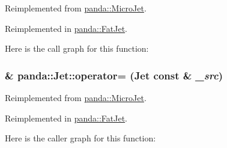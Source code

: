 Reimplemented from \hyperlink{classpanda_1_1MicroJet_ae7b83b860f85cc86b736495317fb7f3a}{panda::MicroJet}.

Reimplemented in \hyperlink{classpanda_1_1FatJet_ad63603b0bd69d4e3b6173a194b3e6829}{panda::FatJet}.

Here is the call graph for this function:\hypertarget{classpanda_1_1Jet_a06509e069beffe7d5fa12a5450254e6a}{
\subsubsection[{operator=}]{ \& panda::Jet::operator= ({\bf Jet} const \& {\em \_\-src})}}
\label{classpanda_1_1Jet_a06509e069beffe7d5fa12a5450254e6a}


Reimplemented from \hyperlink{classpanda_1_1MicroJet_a9375dd6d13362ae323e9915b529458e8}{panda::MicroJet}.

Reimplemented in \hyperlink{classpanda_1_1FatJet_a20e4f6ca23c2a9a603c33e7f023337fe}{panda::FatJet}.

Here is the caller graph for this function:

